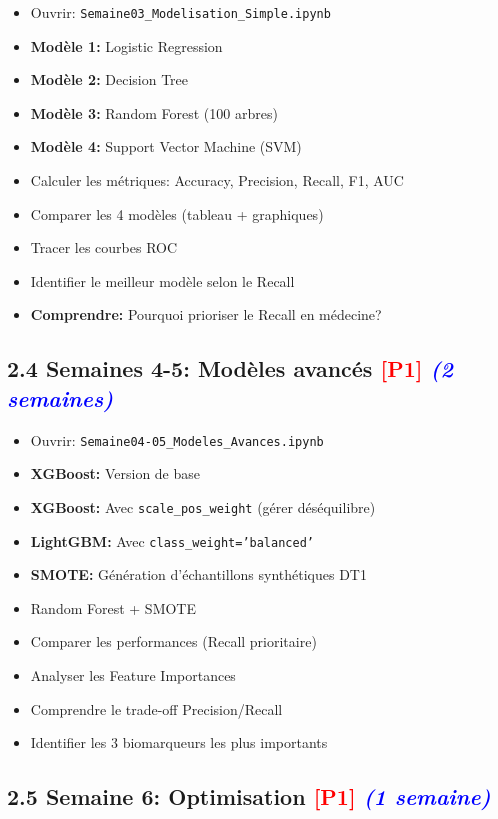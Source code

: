 \documentclass[a4paper,11pt]{article}
\newcommand{\checkbox}{\large$\square$}
\newcommand{\checkboxdone}{\large$\boxtimes$}
\newcommand{\priorite}[1]{\textcolor{red}{\textbf{[#1]}}}
\newcommand{\duree}[1]{\textcolor{blue}{\textit{(#1)}}}
\begin{document}
\begin{itemize}[label=\checkboxdone]
    \item Ouvrir: \texttt{Semaine03\_Modelisation\_Simple.ipynb}
    \item \textbf{Modèle 1:} Logistic Regression
    \item \textbf{Modèle 2:} Decision Tree
    \item \textbf{Modèle 3:} Random Forest (100 arbres)
    \item \textbf{Modèle 4:} Support Vector Machine (SVM)
    \item Calculer les métriques: Accuracy, Precision, Recall, F1, AUC
    \item Comparer les 4 modèles (tableau + graphiques)
    \item Tracer les courbes ROC
    \item Identifier le meilleur modèle selon le Recall
    \item \textbf{Comprendre:} Pourquoi prioriser le Recall en médecine?
\end{itemize}

\subsection*{2.4 Semaines 4-5: Modèles avancés \priorite{P1} \duree{2 semaines}}

\begin{itemize}[label=\checkbox]
    \item Ouvrir: \texttt{Semaine04-05\_Modeles\_Avances.ipynb}
    \item \textbf{XGBoost:} Version de base
    \item \textbf{XGBoost:} Avec \texttt{scale\_pos\_weight} (gérer déséquilibre)
    \item \textbf{LightGBM:} Avec \texttt{class\_weight='balanced'}
    \item \textbf{SMOTE:} Génération d'échantillons synthétiques DT1
    \item Random Forest + SMOTE
    \item Comparer les performances (Recall prioritaire)
    \item Analyser les Feature Importances
    \item Comprendre le trade-off Precision/Recall
    \item Identifier les 3 biomarqueurs les plus importants
\end{itemize}

\subsection*{2.5 Semaine 6: Optimisation \priorite{P1} \duree{1 semaine}}
\end{document}
